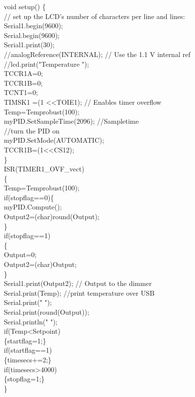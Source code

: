 \noindent void setup() \{\\
	// set up the LCD's number of characters per line and lines: \\
	Serial1.begin(9600);\\
	Serial.begin(9600);\\
	Serial1.print(30);\\
	//analogReference(INTERNAL);  // Use the 1.1 V internal ref\\
	//lcd.print("Temperature ");\\
	TCCR1A=0;\\
	TCCR1B=0;\\
	TCNT1=0;\\
	TIMSK1 \textbar =(1 \textless\textless TOIE1); // Enables timer overflow\\
	Temp=Temprobust(100);\\
	myPID.SetSampleTime(2096); //Sampletime\\
	//turn the PID on\\
	myPID.SetMode(AUTOMATIC);\\
	TCCR1B\textbar=(1\textless\textless CS12);\\
\}\\


\noindent ISR(TIMER1\_OVF\_vect)\\
\{\\
	Temp=Temprobust(100);\\
	if(stopflag==0)\{\\
		myPID.Compute();\\
		Output2=(char)round(Output);\\
	\}\\
	if(stopflag==1)\\
	\{\\
		Output=0;\\
		Output2=(char)Output;\\
	\}\\
	Serial1.print(Output2);  // Output to the dimmer  \\
	Serial.print(Temp);  //print temperature over USB\\
	Serial.print("  ");\\
	Serial.print(round(Output));\\
	Serial.println(" ");\\
	if(Temp\textless Setpoint)\\
	\{startflag=1;\}\\
	if(startflag==1)\\
	\{timesecs+=2;\}\\
	if(timesecs\textgreater 4000)\\
	\{stopflag=1;\}\\
\}\\

